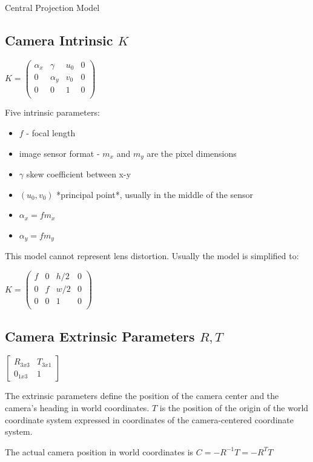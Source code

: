 Central Projection Model
\subsection{Camera Intrinsic $K$}
$K = \left( \begin{matrix} 
\alpha_x & \gamma & u_0 & 0 \\
0 & \alpha_y  & v_0 & 0 \\
0 & 0 &  1 & 0 \\
\end{matrix}
\right) $

Five intrinsic parameters:
\begin{itemize}
\item $f$ - focal length
\item  image sensor format - $m_x$ and $m_y$ are the pixel dimensions
\item  $\gamma$ skew coefficient between x-y
\item  $(u_0,v_0)$ *principal point*, usually in the middle of the sensor
\item  $\alpha_x = f m_x $
\item  $\alpha_y = f m_y $
\end{itemize}

This model cannot represent lens distortion. Usually the model is simplified to:

$ K = \left( \begin{matrix} 
f & 0 & h/2 & 0 \\
0 & f  & w/2 & 0 \\
0 & 0 &  1 & 0 \\
\end{matrix}
\right) $

\subsection{Camera Extrinsic Parameters $R,T$}

$ \left[ 
\begin{matrix} 
R_{3x3} & T_{3x1} \\
0_{1x3} & 1 
\end{matrix}
\right] $

The extrinsic parameters define the position of the camera center and the camera's heading in world coordinates. $T$ is the position of the origin of the world coordinate system expressed in coordinates of the camera-centered coordinate system. 

The actual camera position in world coordinates is $C = -R^{-1}T=-R^{T}T $

